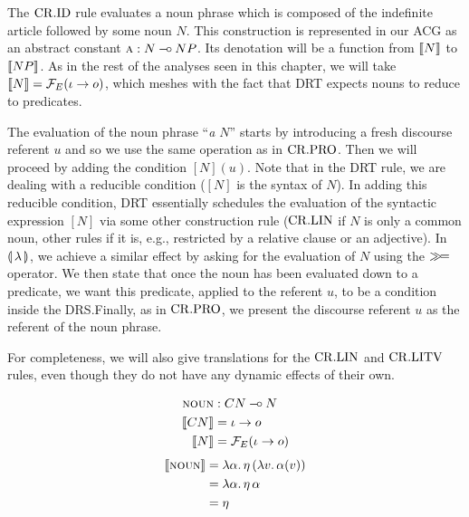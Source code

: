 \vspace{3mm}

The $\mathrm{CR.ID}$ rule evaluates a noun phrase which is composed of the
indefinite article followed by some noun $N$. This construction is
represented in our ACG as an abstract constant $\textsc{a} : N \mathbin{{-}\mkern-3.5mu{\circ}} NP$. Its
denotation will be a function from $\llbracket N \rrbracket$ to $\llbracket NP \rrbracket$. As in the rest
of the analyses seen in this chapter, we will take
$\llbracket N \rrbracket = \mathcal{F}_E(\iota \to o)$, which meshes with the fact that DRT expects
nouns to reduce to predicates.

The evaluation of the noun phrase ``\emph{a $N$}'' starts by introducing a
fresh discourse referent $u$ and so we use the same operation as in
$\mathrm{CR.PRO}$. Then we will proceed by adding the condition $[N](u)$. Note that
in the DRT rule, we are dealing with a reducible condition ($[N]$ is the
syntax of $N$). In adding this reducible condition, DRT essentially
schedules the evaluation of the syntactic expression $[N]$ via some other
construction rule ($\mathrm{CR.LIN}$ if $N$ is only a common noun, other rules if it
is, e.g., restricted by a relative clause or an adjective). In
$\llparenthesis \, \lambda \, \rrparenthesis$, we achieve a similar effect by asking for the
evaluation of $N$ using the $\mathbin{\gg\!=}$ operator. We then state that once the
noun has been evaluated down to a predicate, we want this predicate,
applied to the referent $u$, to be a condition inside the DRS.\@ Finally,
as in $\mathrm{CR.PRO}$, we present the discourse referent $u$ as the referent of
the noun phrase.

For completeness, we will also give translations for the $\mathrm{CR.LIN}$ and
$\mathrm{CR.LITV}$ rules, even though they do not have any dynamic effects of their
own.

\vspace{3mm}

\begin{minipage}{0.5\textwidth}
\crlinbox
\end{minipage}
\begin{minipage}{0.5\textwidth}
\begin{align*}
\textsc{noun} &: CN \mathbin{{-}\mkern-3.5mu{\circ}} N \\
\llbracket CN \rrbracket &= \iota \to o \\
\llbracket N \rrbracket &= \mathcal{F}_E(\iota \to o)
\end{align*}
\begin{align*}
\llbracket \textsc{noun} \rrbracket &= \lambda \alpha.\, \eta\,(\lambda v.\, \alpha(v)) \\
                 &= \lambda \alpha.\, \eta\,\alpha \\
                 &= \eta
\end{align*}
\end{minipage}

